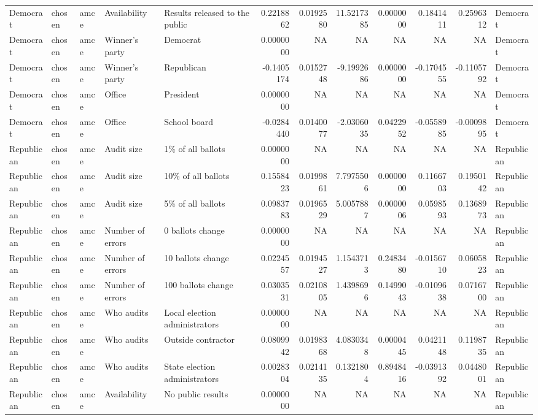 \begin{table}
\begin{tabular}[t]{lllllrrrrrrl}
Democrat & chosen & amce & Availability & Results released to the public & 0.2218862 & 0.0192580 & 11.5217385 & 0.0000000 & 0.1841411 & 0.2596312 & Democrat\\
Democrat & chosen & amce & Winner's party & Democrat & 0.0000000 & NA & NA & NA & NA & NA & Democrat\\
Democrat & chosen & amce & Winner's party & Republican & -0.1405174 & 0.0152748 & -9.1992686 & 0.0000000 & -0.1704555 & -0.1105792 & Democrat\\
\addlinespace
Democrat & chosen & amce & Office & President & 0.0000000 & NA & NA & NA & NA & NA & Democrat\\
Democrat & chosen & amce & Office & School board & -0.0284440 & 0.0140077 & -2.0306035 & 0.0422952 & -0.0558985 & -0.0009895 & Democrat\\
Republican & chosen & amce & Audit size & 1\% of all ballots & 0.0000000 & NA & NA & NA & NA & NA & Republican\\
Republican & chosen & amce & Audit size & 10\% of all ballots & 0.1558423 & 0.0199861 & 7.7975506 & 0.0000000 & 0.1166703 & 0.1950142 & Republican\\
Republican & chosen & amce & Audit size & 5\% of all ballots & 0.0983783 & 0.0196529 & 5.0057887 & 0.0000006 & 0.0598593 & 0.1368973 & Republican\\
\addlinespace
Republican & chosen & amce & Number of errors & 0 ballots change & 0.0000000 & NA & NA & NA & NA & NA & Republican\\
Republican & chosen & amce & Number of errors & 10 ballots change & 0.0224557 & 0.0194527 & 1.1543713 & 0.2483480 & -0.0156710 & 0.0605823 & Republican\\
Republican & chosen & amce & Number of errors & 100 ballots change & 0.0303531 & 0.0210805 & 1.4398696 & 0.1499043 & -0.0109638 & 0.0716700 & Republican\\
Republican & chosen & amce & Who audits & Local election administrators & 0.0000000 & NA & NA & NA & NA & NA & Republican\\
Republican & chosen & amce & Who audits & Outside contractor & 0.0809942 & 0.0198368 & 4.0830348 & 0.0000445 & 0.0421148 & 0.1198735 & Republican\\
\addlinespace
Republican & chosen & amce & Who audits & State election administrators & 0.0028304 & 0.0214135 & 0.1321804 & 0.8948416 & -0.0391392 & 0.0448001 & Republican\\
Republican & chosen & amce & Availability & No public results & 0.0000000 & NA & NA & NA & NA & NA & Republican\\

\end{tabular}
\end{table}
